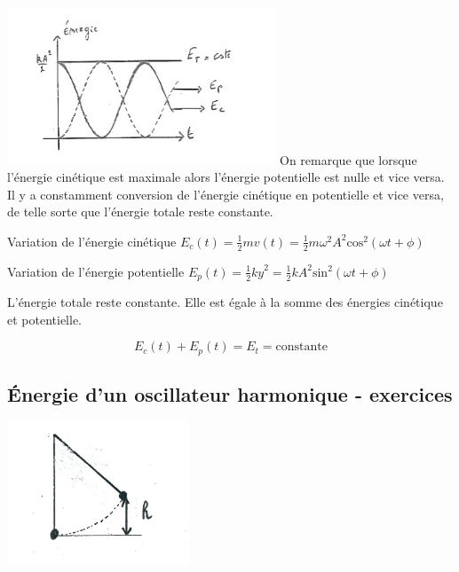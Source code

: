 \begin{multicols}{2}
\begin{center}
\begin{minipage}{8.89cm}
\includegraphics[width=8cm]{COURS2EnergieOHEXERCRESOL-img/COURS2EnergieOHEXERCRESOL-img001.png}
On remarque que lorsque l’énergie cinétique est maximale alors l’énergie potentielle
est nulle et vice versa. Il y a constamment conversion de l’énergie cinétique en potentielle et vice versa, de telle
sorte que l’énergie totale reste constante. 
\end{minipage}
\end{center}

Variation de l’énergie cinétique   $E_c(t)=\frac{1}{2}mv(t)=\frac{1}{2}m\omega ^2A^2\text{cos}^2(\omega t+\phi )$

Variation de l’énergie potentielle  $E_p(t)=\frac{1}{2}\mathit{ky}^2=\frac{1}{2}kA^2\text{sin}^2(\omega t+\phi )$

L’énergie totale reste constante. Elle est égale à la somme des énergies cinétique et potentielle. 

\begin{equation*}
E_c(t)+E_p(t)=E_t=\text{constante}
\end{equation*}


\subsection{Énergie d’un oscillateur harmonique - exercices}

\begin{center}
\begin{minipage}{5.992cm}
 \includegraphics[width=5.457cm,height=4.239cm]{COURS2EnergieOHEXERCRESOL-img/COURS2EnergieOHEXERCRESOL-img002.png} 
\end{minipage}
\end{center}

\end{multicols}
